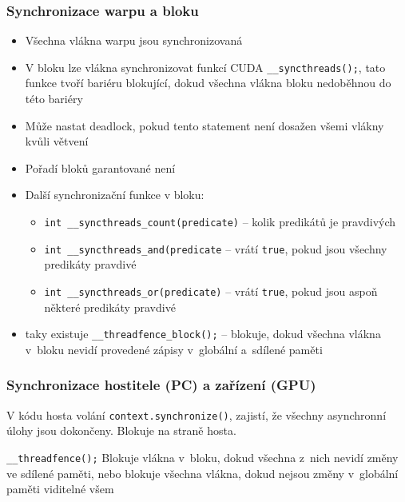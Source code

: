 \subsubsection{Synchronizace warpu a bloku}
\begin{itemize}
    \item Všechna vlákna warpu jsou synchronizovaná
    \item V bloku lze vlákna synchronizovat funkcí CUDA \texttt{\_\_syncthreads();}, tato funkce tvoří bariéru blokující, dokud všechna vlákna bloku nedoběhnou do této bariéry
    \item Může nastat deadlock, pokud tento statement není dosažen všemi vlákny kvůli větvení
    \item Pořadí bloků garantované není
    \item Další synchronizační funkce v bloku:
    \begin{itemize}
        \item \texttt{int \_\_syncthreads\_count(predicate)} -- kolik predikátů je pravdivých
        \item \texttt{int \_\_syncthreads\_and(predicate} -- vrátí \texttt{true}, pokud jsou všechny predikáty pravdivé
        \item \texttt{int \_\_syncthreads\_or(predicate)} -- vrátí \texttt{true}, pokud jsou aspoň některé predikáty pravdivé
    \end{itemize}
    \item taky existuje \texttt{\_\_threadfence\_block();} -- blokuje, dokud všechna vlákna v~bloku nevidí provedené zápisy v~globální a~sdílené paměti
\end{itemize}

\subsubsection{Synchronizace hostitele (PC) a zařízení (GPU)}
V kódu hosta volání \texttt{context.synchronize()}, zajistí, že všechny asynchronní úlohy jsou dokončeny. Blokuje na straně hosta.

\texttt{\_\_threadfence();} Blokuje vlákna v~bloku, dokud všechna z~nich nevidí změny ve sdílené paměti, nebo blokuje všechna vlákna, dokud nejsou změny v~globální paměti viditelné všem

